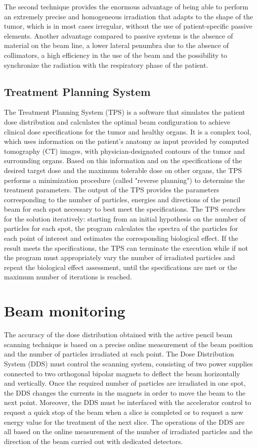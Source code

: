 \noindent The second technique provides the enormous advantage of being able to perform an extremely precise and homogeneous irradiation that adapts to the shape of the tumor, which is in most cases irregular, without the use of patient-specific passive elements.
Another advantage compared to passive systems is the absence of material on the beam line, a lower lateral penumbra due to the absence of collimators, a high efficiency in the use of the beam and the possibility to synchronize the radiation with the respiratory phase of the patient.

\subsection{Treatment Planning System}
\noindent The Treatment Planning System (TPS) is a software that simulates the patient dose distribution and calculates the optimal beam configuration to achieve clinical dose specifications for the tumor and healthy organs.
It is a complex tool, which uses information on the patient's anatomy as input provided by computed tomography (CT) images, with physician-designated contours of the tumor and surrounding organs.
Based on this information and on the specifications of the desired target dose and the maximum tolerable dose on other organs, the TPS performs a minimization procedure (called "reverse planning") to determine the treatment parameters.
The output of the TPS provides the parameters corresponding to the number of particles, energies and directions of the pencil beam for each spot necessary to best meet the specifications.
The TPS searches for the solution iteratively: starting from an initial hypothesis on the number of particles for each spot, the program calculates the spectra of the particles for each point of interest and estimates the corresponding biological effect.
If the result meets the specifications, the TPS can terminate the execution while if not the program must appropriately vary the number of irradiated particles and repeat the biological effect assessment, until the specifications are met or the maximum number of iterations is reached.


\section{Beam monitoring}
\noindent The accuracy of the dose distribution obtained with the active pencil beam scanning technique is based on a precise online measurement of the beam position and the number of particles irradiated at each point.
The Dose Distribution System (DDS)\cite{pencil} must control the scanning system, consisting of two power supplies connected to two orthogonal bipolar magnets to deflect the beam horizontally and vertically.
Once the required number of particles are irradiated in one spot, the DDS changes the currents in the magnets in order to move the beam to the next point.
Moreover, the DDS must be interfaced with the accelerator control to request a quick stop of the beam when a slice is completed or to request a new energy value for the treatment of the next slice.
The operations of the DDS are all based on the online measurement of the number of irradiated particles and the direction of the beam carried out with dedicated detectors.
